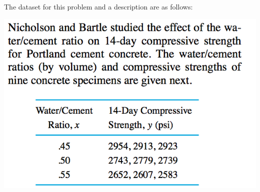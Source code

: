 \documentclass{article}\usepackage{graphicx, color}
\numberwithin{equation}{section}
\begin{document}
\begin{flushleft}
\begin{enumerate}[1. ]
The dataset for this problem and a description are as follows:

\includegraphics{../../fig/nicholson.png}


\end{enumerate}
\end{flushleft}
\end{document}
